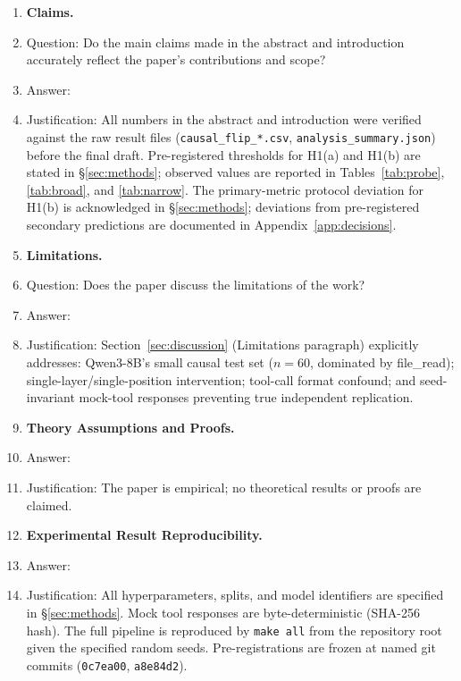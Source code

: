 \documentclass{article}
\begin{document}
\begin{enumerate}

\item \textbf{Claims.}
\item[] Question: Do the main claims made in the abstract and introduction
accurately reflect the paper's contributions and scope?
\item[] Answer: \answerYes{}
\item[] Justification: All numbers in the abstract and introduction
were verified against the raw result files (\texttt{causal\_flip\_*.csv},
\texttt{analysis\_summary.json}) before the final draft.
Pre-registered thresholds for H1(a) and H1(b) are stated in
\S\ref{sec:methods}; observed values are reported in
Tables~\ref{tab:probe}, \ref{tab:broad}, and \ref{tab:narrow}.
The primary-metric protocol deviation for H1(b) is acknowledged in
\S\ref{sec:methods}; deviations from pre-registered secondary
predictions are documented in Appendix~\ref{app:decisions}.

\item \textbf{Limitations.}
\item[] Question: Does the paper discuss the limitations of the work?
\item[] Answer: \answerYes{}
\item[] Justification: Section~\ref{sec:discussion} (Limitations
paragraph) explicitly addresses: Qwen3-8B's small causal test set
($n{=}60$, dominated by file\_read); single-layer/single-position
intervention; tool-call format confound; and seed-invariant mock-tool
responses preventing true independent replication.

\item \textbf{Theory Assumptions and Proofs.}
\item[] Answer: \answerNA{}
\item[] Justification: The paper is empirical; no theoretical results
or proofs are claimed.

\item \textbf{Experimental Result Reproducibility.}
\item[] Answer: \answerYes{}
\item[] Justification: All hyperparameters, splits, and model
identifiers are specified in \S\ref{sec:methods}.
Mock tool responses are byte-deterministic (SHA-256 hash).
The full pipeline is reproduced by \texttt{make all} from the
repository root given the specified random seeds.  Pre-registrations
are frozen at named git commits (\texttt{0c7ea00}, \texttt{a8e84d2}).


\end{enumerate}
\end{document}

